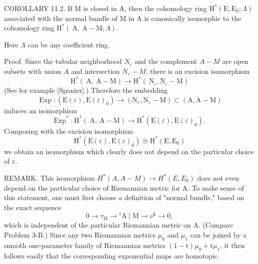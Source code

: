 \documentclass[10pt]{article}
\begin{document}
COROLLARY 11.2. If $\mathrm{M}$ is closed in $\mathrm{A}$, then the cohomology ring $\mathrm{H}^{*}\left(\mathrm{E}, \mathrm{E}_{0} ; \Lambda\right)$ associated with the normal bundle of $\mathrm{M}$ in $\mathrm{A}$ is canonically isomorphic to the cohomology ring $\mathrm{H}^{*}(\mathrm{~A}, \mathrm{~A}-\mathrm{M} ; \Lambda)$.

Here $\Lambda$ can be any coefficient ring.

Proof. Since the tubular neighborhood $N_{\varepsilon}$ and the complement $A-M$ are open subsets with union $A$ and intersection $N_{\varepsilon}-M$, there is an excision isomorphism
$$
\mathrm{H}^{*}(\mathrm{~A}, \mathrm{~A}-\mathrm{M}) \rightarrow \mathrm{H}^{*}\left(\mathrm{~N}_{\varepsilon}, \mathrm{N}_{\varepsilon}-\mathrm{M}\right)
$$
(See for example [Spanier].) Therefore the embedding
$$
\operatorname{Exp}:\left(\mathrm{E}(\varepsilon), \mathrm{E}(\varepsilon)_{0}\right) \rightarrow\left(\mathrm{N}_{\varepsilon}, \mathrm{N}_{\varepsilon}-\mathrm{M}\right) \subset(\mathrm{A}, \mathrm{A}-\mathrm{M})
$$
induces an isomorphism
$$
\operatorname{Exp}^{*}: \mathrm{H}^{*}(\mathrm{~A}, \mathrm{~A}-\mathrm{M}) \rightarrow \mathrm{H}^{*}\left(\mathrm{E}(\varepsilon), \mathrm{E}(\varepsilon)_{0}\right) \text {. }
$$
Composing with the excision isomorphism
$$
\mathrm{H}^{*}\left(\mathrm{E}(\varepsilon), \mathrm{E}(\varepsilon)_{0}\right) \cong \mathrm{H}^{*}\left(\mathrm{E}, \mathrm{E}_{0}\right)
$$
we obtain an isomorphism which clearly does not depend on the particular choice of $\varepsilon$.

REMARK. This isomorphism $H^{*}(A, A-M) \rightarrow H^{*}\left(E, E_{0}\right)$ does not even depend on the particular choice of Riemannian metric for A. To make sense of this statement, one must first choose a definition of "normal bundle," based on the exact sequence
$$
0 \rightarrow \tau_{\mathrm{M}} \rightarrow{ }^{\tau} \mathrm{A} \mid \mathrm{M} \rightarrow \nu^{\mathrm{k}} \rightarrow 0,
$$
which is independent of the particular Riemannian metric on A. (Compare Problem 3-B.) Since any two Riemannian metrics $\mu_{0}$ and $\mu_{1}$ can be joined by a smooth one-parameter family of Riemannian metrics $(1-\mathrm{t}) \mu_{0}+\mathrm{t} \mu_{1}$, it then follows easily that the corresponding exponential maps are homotopic.
\end{document}
